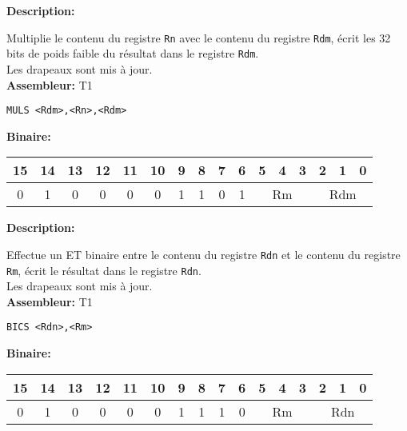 \documentclass{article}
\newcounter{subsubsubsection}[subsubsection]
\begin{document}

\textbf{Description: }

Multiplie le contenu du registre \texttt{Rn} avec le contenu du registre \texttt{Rdm}, écrit les 32 bits de poids faible du résultat dans le registre \texttt{Rdm}.\\
Les drapeaux sont mis à jour.\\

\textbf{Assembleur:} T1

\begin{lstlisting}
MULS <Rdm>,<Rn>,<Rdm>
\end{lstlisting}

\textbf{Binaire:}\\

\begin{tabular}{| c c c c c c c c c c c c c c c c |}
\hline
15 & 14 & 13 & 12 & 11 & 10 & \multicolumn{1}{|c}{9} & 8 & 7 & 6 & \multicolumn{1}{|c}{5} & 4 & 3 & \multicolumn{1}{|c}{2} & 1 & 0 \\
\hline
0 & 1 & 0 & 0 & 0 & 0 & \multicolumn{1}{|c}{1} & 1 & 0 & 1 & \multicolumn{3}{|c}{Rm} & \multicolumn{3}{|c|}{Rdm} \\
\hline
\end{tabular}



\textbf{Description: }

Effectue un ET binaire entre le contenu du registre \texttt{Rdn} et le contenu du registre \texttt{Rm}, écrit le résultat dans le registre \texttt{Rdn}.\\
Les drapeaux sont mis à jour.\\

\textbf{Assembleur:} T1

\begin{lstlisting}
BICS <Rdn>,<Rm>
\end{lstlisting}

\textbf{Binaire:}\\

\begin{tabular}{| c c c c c c c c c c c c c c c c |}
\hline
15 & 14 & 13 & 12 & 11 & 10 & \multicolumn{1}{|c}{9} & 8 & 7 & 6 & \multicolumn{1}{|c}{5} & 4 & 3 & \multicolumn{1}{|c}{2} & 1 & 0 \\
\hline
0 & 1 & 0 & 0 & 0 & 0 & \multicolumn{1}{|c}{1} & 1 & 1 & 0 & \multicolumn{3}{|c}{Rm} & \multicolumn{3}{|c|}{Rdn} \\
\hline
\end{tabular}
\end{document}
